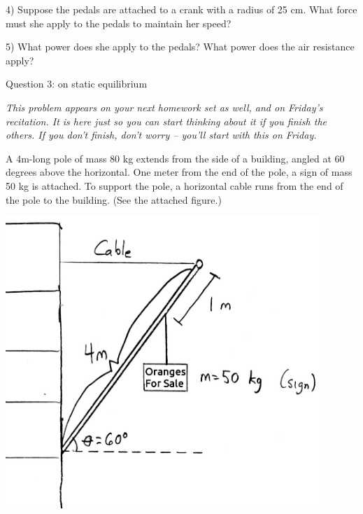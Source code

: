 \documentclass[12pt]{article}
\begin{document}
\newpage

       4) Suppose the pedals are attached to a crank with a radius of 25 cm. What force must she apply to the pedals to maintain her speed?
\vspace{3in}

       5) What power does she apply to the pedals? What power does the air resistance apply?

\newpage
\centerline{\large Question 3: on static equilibrium}

\begin{center}
\it \normalsize This problem appears on your next homework set as well, and on Friday's recitation. It is here just so you can start thinking about it if you finish the others.
If you don't finish, don't worry -- you'll start with this on Friday.
\end{center}


\begin{minipage}[b]{0.4\textwidth}
  \vspace{-0.8in}

A 4m-long pole of mass 80 kg extends from the side of a building, angled at 60 degrees above the horizontal. One meter from the end of the pole, a sign of mass 50 kg is attached. To support the pole,
a horizontal cable runs from the end of the pole to the building. (See the attached figure.)

\bigskip
\bigskip
\bigskip
\bigskip
\bigskip
\bigskip

\end{minipage}
\begin{minipage}[t]{0.6\textwidth}
  \begin{flushright}
  \includegraphics[width=0.9\textwidth]{sign2.jpg}
\end{flushright}
\end{minipage}
\end{document}
